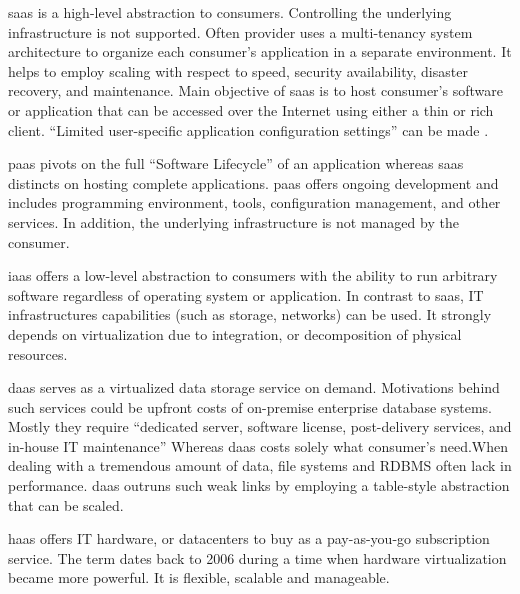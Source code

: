 \ac{saas} is a high-level abstraction to consumers. Controlling the underlying infrastructure is not supported.
Often provider uses a multi-tenancy system architecture to organize each consumer's application in a separate environment.
It helps to employ scaling with respect to speed, security availability, disaster recovery, and maintenance.
Main objective of \ac{saas} is to host consumer's software or application that can be accessed over the Internet using either a thin or rich client. \cite{Dillon2010}
\enquote{Limited user-specific application configuration settings} can be made \cite{Mell2011}.

\ac{paas} pivots on the full \enquote{Software Lifecycle} of an application whereas \ac{saas} distincts on hosting complete applications.
\ac{paas} offers ongoing development and includes programming environment, tools, configuration management, and other services.
In addition, the underlying infrastructure is not managed by the consumer. \cite{Mell2011}

\ac{iaas} offers a low-level abstraction to consumers with the ability to run arbitrary software regardless of operating system or application.
In contrast to \ac{saas}, IT infrastructures capabilities (such as storage, networks) can be used.
It strongly depends on virtualization due to integration, or decomposition of physical resources. \cite{Mell2011}

\ac{daas} serves as a virtualized data storage service on demand. Motivations behind such services could be upfront costs of on-premise enterprise database systems. \cite{Dillon2010}
Mostly they require \enquote{dedicated server, software license, post-delivery services, and in-house IT maintenance} \cite{Dillon2010}
Whereas \ac{daas} costs solely what consumer's need.When dealing with a tremendous amount of data, file systems and RDBMS often lack in performance.
\ac{daas} outruns such weak links by employing a table-style abstraction that can be scaled.\cite{Dillon2010}

\ac{haas} offers IT hardware, or datacenters to buy as a pay-as-you-go subscription service.
The term dates back to 2006 during a time when hardware virtualization became more powerful.
It is flexible, scalable and manageable.\cite{Wang2010}


